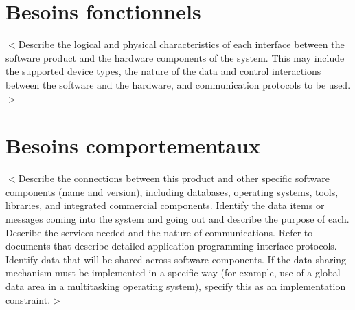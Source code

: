 \documentclass{scrreprt}
\begin{document}
\section{Besoins fonctionnels}
$<$Describe the logical and physical characteristics of each interface between 
the software product and the hardware components of the system. This may include 
the supported device types, the nature of the data and control interactions 
between the software and the hardware, and communication protocols to be 
used.$>$

\section{Besoins comportementaux}
$<$Describe the connections between this product and other specific software 
components (name and version), including databases, operating systems, tools, 
libraries, and integrated commercial components. Identify the data items or 
messages coming into the system and going out and describe the purpose of each.  
Describe the services needed and the nature of communications. Refer to 
documents that describe detailed application programming interface protocols.  
Identify data that will be shared across software components. If the data 
sharing mechanism must be implemented in a specific way (for example, use of a 
global data area in a multitasking operating system), specify this as an 
implementation constraint.$>$
\end{document}
